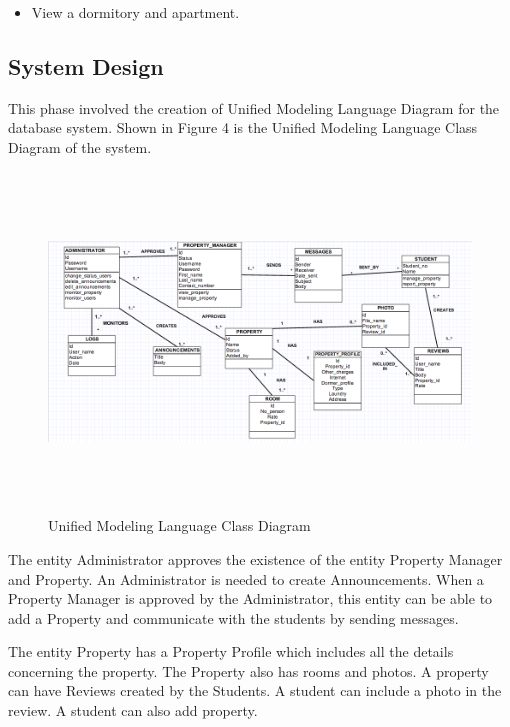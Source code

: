 \documentclass[journal]{./IEEE/IEEEtran}
\begin{document}
\begin{enumerate}
\begin{itemize}
\begin{itemize}
					\end{itemize}
				\item View a dormitory and apartment.
			\end{itemize}
		\end{enumerate}
	\subsection{System Design}
		This phase involved the creation of Unified Modeling Language Diagram for the database system. Shown in Figure 4 is the Unified Modeling Language Class Diagram of the system.
		\begin{figure}  
			
			\includegraphics[width=20cm,height=9cm]{images/uml.png}
			\caption{Unified Modeling Language Class Diagram}
			\label{fig:erd}
	\end{figure}

		The entity Administrator approves the existence of the entity Property Manager and Property. An Administrator is needed to create Announcements. When a Property Manager is approved by the Administrator, this entity can be able to add a Property and communicate with the students by sending messages.

		The entity Property has a Property Profile which includes all the details concerning the property. The Property also has rooms and photos. A property can have Reviews created by the Students. A student can include a photo in the review. A student can also add property.
	



\nocite{*}
\end{document}
